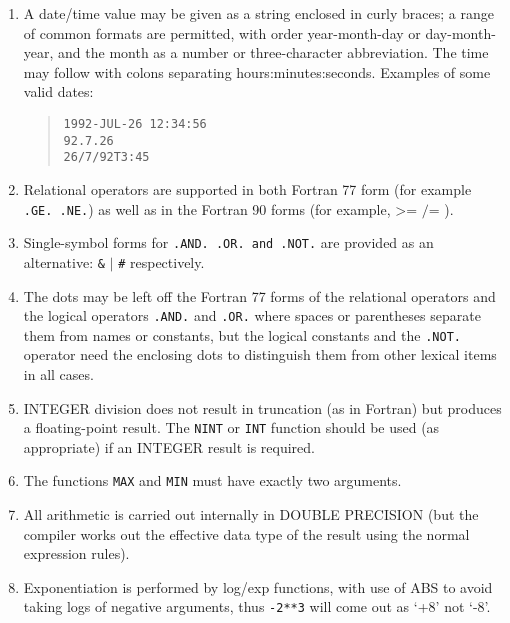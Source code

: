 \documentclass[11pt,twoside]{starlink}
\begin{document}
\begin{enumerate}
  \item A date/time value may be given as a string enclosed in curly
   braces; a range of common formats are permitted, with order
   year-month-day or day-month-year, and the month as a number or
   three-character abbreviation.  The time may follow with colons separating
   hours:minutes:seconds.  Examples of some valid dates:
  \begin{verse}
   \texttt{1992-JUL-26 12:34:56}  \\
   \texttt{92.7.26}  \\
   \texttt{26/7/92T3:45}
  \end{verse}

  \item Relational operators are supported in both Fortran 77 form
   (for example \texttt{.GE. .NE.}) as well as in the Fortran 90 forms (for
   example, $\texttt{>=}$ $\texttt{/=}$ ).

  \item Single-symbol forms for \texttt{.AND. .OR. and .NOT.} are provided as
   an alternative: \texttt{\&} $\texttt{|}$ \texttt{\#} respectively.

  \item The dots may be left off the Fortran 77 forms of the relational
   operators and the logical operators \texttt{.AND.} and \texttt{.OR.} where
   spaces or parentheses separate them from names or constants, but the
   logical constants and the \texttt{.NOT.} operator need the enclosing dots
   to distinguish them from other lexical items in all cases.

  \item INTEGER division does not result in truncation (as in Fortran)
   but produces a floating-point result.  The \texttt{NINT} or \texttt{INT}
   function should be used (as appropriate) if an INTEGER result is
   required.

  \item The functions \texttt{MAX} and \texttt{MIN} must have exactly two
   arguments.

  \item All arithmetic is carried out internally in DOUBLE PRECISION
   (but the compiler works out the effective data type of the result using
   the normal expression rules).

  \item Exponentiation is performed by log/exp functions, with use of
   ABS to avoid taking logs of negative arguments, thus \texttt{-2**3} will
   come out as `+8' not `-8'.

\end{enumerate}
\end{document}
